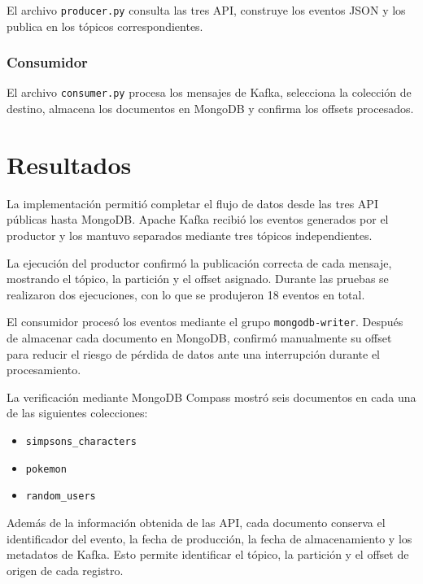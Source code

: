 El archivo \texttt{producer.py} consulta las tres API, construye los eventos
JSON y los publica en los tópicos correspondientes.



\subsubsection{Consumidor}

El archivo \texttt{consumer.py} procesa los mensajes de Kafka, selecciona la
colección de destino, almacena los documentos en MongoDB y confirma los
offsets procesados.



\section{Resultados}

La implementación permitió completar el flujo de datos desde las tres API
públicas hasta MongoDB. Apache Kafka recibió los eventos generados por el
productor y los mantuvo separados mediante tres tópicos independientes.

La ejecución del productor confirmó la publicación correcta de cada mensaje,
mostrando el tópico, la partición y el offset asignado. Durante las pruebas se
realizaron dos ejecuciones, con lo que se produjeron 18 eventos en total.

El consumidor procesó los eventos mediante el grupo
\texttt{mongodb-writer}. Después de almacenar cada documento en MongoDB,
confirmó manualmente su offset para reducir el riesgo de pérdida de datos ante
una interrupción durante el procesamiento.

La verificación mediante MongoDB Compass mostró seis documentos en cada una de
las siguientes colecciones:

\begin{itemize}
    \item \texttt{simpsons\_characters}
    \item \texttt{pokemon}
    \item \texttt{random\_users}
\end{itemize}

Además de la información obtenida de las API, cada documento conserva el
identificador del evento, la fecha de producción, la fecha de almacenamiento y
los metadatos de Kafka. Esto permite identificar el tópico, la partición y el
offset de origen de cada registro.

